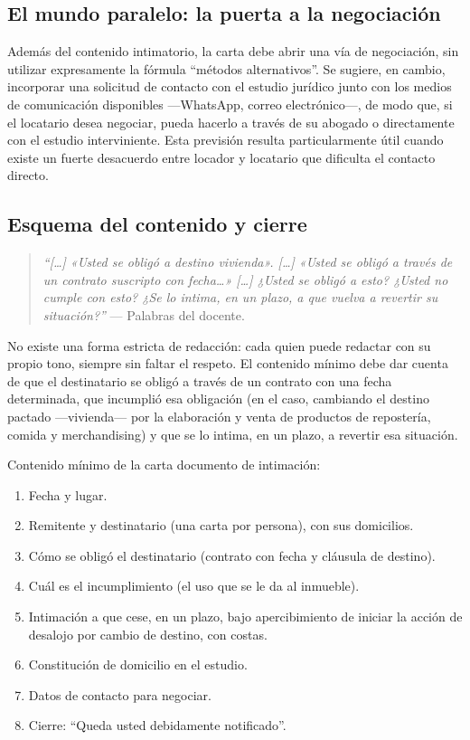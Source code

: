 \documentclass[12pt,oneside]{book}
\begin{document}
\subsection*{El mundo paralelo: la puerta a la negociación}

Además del contenido intimatorio, la carta debe abrir una vía de negociación, sin utilizar expresamente la fórmula ``métodos alternativos''. Se sugiere, en cambio, incorporar una solicitud de contacto con el estudio jurídico junto con los medios de comunicación disponibles —WhatsApp, correo electrónico—, de modo que, si el locatario desea negociar, pueda hacerlo a través de su abogado o directamente con el estudio interviniente. Esta previsión resulta particularmente útil cuando existe un fuerte desacuerdo entre locador y locatario que dificulta el contacto directo.

\subsection*{Esquema del contenido y cierre}

\begin{quote}
\textit{``[…] «Usted se obligó a destino vivienda». […] «Usted se obligó a través de un contrato suscripto con fecha…» […] ¿Usted se obligó a esto? ¿Usted no cumple con esto? ¿Se lo intima, en un plazo, a que vuelva a revertir su situación?''} --- Palabras del docente.
\end{quote}

No existe una forma estricta de redacción: cada quien puede redactar con su propio tono, siempre sin faltar el respeto. El contenido mínimo debe dar cuenta de que el destinatario se obligó a través de un contrato con una fecha determinada, que incumplió esa obligación (en el caso, cambiando el destino pactado —vivienda— por la elaboración y venta de productos de repostería, comida y merchandising) y que se lo intima, en un plazo, a revertir esa situación.

\begin{important}
Contenido mínimo de la carta documento de intimación:
\begin{enumerate}
\item Fecha y lugar.
\item Remitente y destinatario (una carta por persona), con sus domicilios.
\item Cómo se obligó el destinatario (contrato con fecha y cláusula de destino).
\item Cuál es el incumplimiento (el uso que se le da al inmueble).
\item Intimación a que cese, en un plazo, bajo apercibimiento de iniciar la acción de desalojo por cambio de destino, con costas.
\item Constitución de domicilio en el estudio.
\item Datos de contacto para negociar.
\item Cierre: ``Queda usted debidamente notificado''.
\end{enumerate}
\end{important}
\end{document}
